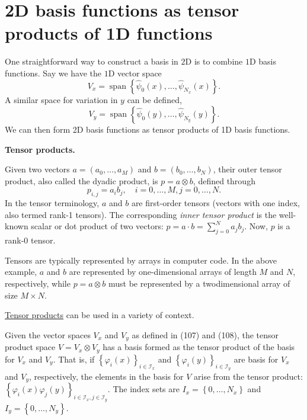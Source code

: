 \documentclass[../main.tex]{subfiles}
\begin{document}
\section[2D basis functions as tensor products of 1D functions]{2D basis functions as tensor products of 1D functions}
\label{sec:sec_8_1}

\noindent One straightforward way to construct a basis in $2 \mathrm{D}$ is to combine $1 \mathrm{D}$ basis functions. Say we have the $1 \mathrm{D}$ vector space
\begin{equation}\label{eqa107}
	V_{x}=\operatorname{span}\left\{\hat{\psi}_{0}(x), \ldots, \hat{\psi}_{N_{x}}(x)\right\}.
\end{equation}
A similar space for variation in $y$ can be defined,
\begin{equation}\label{eqa108}
	V_{y}=\operatorname{span}\left\{\hat{\psi}_{0}(y), \ldots, \hat{\psi}_{N_{y}}(y)\right\}.
\end{equation}
We can then form 2D basis functions as tensor products of 1D basis functions.
\begin{mybox}
	\textbf{Tensor products.}
	
	Given two vectors $a=\left(a_{0}, \ldots, a_{M}\right)$ and $b=\left(b_{0}, \ldots, b_{N}\right)$, their outer tensor product, also called the dyadic product, is $p=a \otimes b$, defined through
	$$
	p_{i, j}=a_{i} b_{j}, \quad i=0, \ldots, M, j=0, \ldots, N .
	$$
	In the tensor terminology, $a$ and $b$ are first-order tensors (vectors with one
	index, also termed rank-1 tensors). The corresponding \textit{inner tensor product} is the well-known scalar or dot product of two vectors: $p=a \cdot b=\sum_{j=0}^{N} a_{j} b_{j}$. Now, $p$ is a rank-0 tensor.
	
	Tensors are typically represented by arrays in computer code. In the above example, $a$ and $b$ are represented by one-dimensional arrays of length $M$ and $N$, respectively, while $p=a \otimes b$ must be represented by a twodimensional array of size $M \times N$.
	
	\href{https://en.wikipedia.org/wiki/Tensor_product}{Tensor products} can be used in a variety of context.
\end{mybox}

Given the vector spaces $V_{x}$ and $V_{y}$ as defined in (107) and (108), the tensor product space $V=V_{x} \otimes V_{y}$ has a basis formed as the tensor product of the basis for $V_{x}$ and $V_{y}$. That is, if $\left\{\varphi_{i}(x)\right\}_{i \in \mathcal{I}_{x}}$ and $\left\{\varphi_{i}(y)\right\}_{i \in \mathcal{I}_{y}}$ are basis for $V_{x}$ and $V_{y}$, respectively, the elements in the basis for $V$ arise from the tensor product: $\left\{\varphi_{i}(x) \varphi_{j}(y)\right\}_{i \in \mathcal{I}_{x}, j \in \mathcal{I}_{y}}$. The index sets are $I_{x}=\left\{0, \ldots, N_{x}\right\}$ and $I_{y}=\left\{0, \ldots, N_{y}\right\}$.
\end{document}
